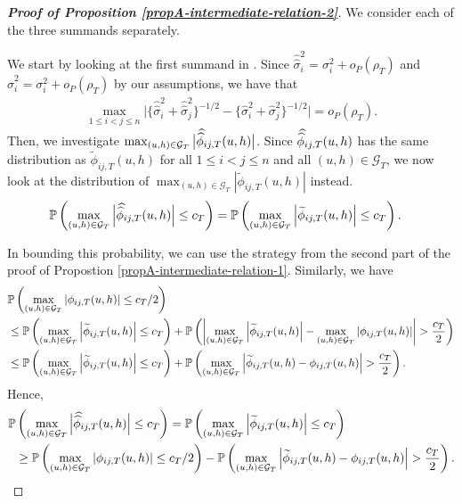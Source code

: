 \documentclass[a4paper,12pt]{article}
\makeatletter
\renewcommand{\eqref}[1]{\tagform@{\ref{#1}}}
\newcommand{\doublehat}[1]{\skew{5.5}\widehat{\widehat{#1}}}
\newcommand{\doublehattwo}[1]{\widehat{\widehat{#1}}}
\makeatother
\begin{document}
\begin{proof}[\textnormal{\textbf{Proof of Proposition \ref{propA-intermediate-relation-2}}}]
We consider each of the three summands separately.

We start by looking at the first summand in \eqref{ineq-diff-1}. Since $\doublehattwo{\sigma}_i^2 = \sigma_i^2 + o_P(\rho_T)$ and $\widehat{\sigma}_i^2 = \sigma_i^2 + o_P(\rho_T)$ by our assumptions, we have that 
\begin{align}\label{ineq-diff-2}
\max_{1 \le i < j \le n} \big|\{\doublehattwo{\sigma}_i^2 + \doublehattwo{\sigma}_j^2 \}^{-1/2} - \{\widehat{\sigma}_i^2 + \widehat{\sigma}_j^2 \}^{-1/2}\big| = o_P(\rho_T).
\end{align}
Then, we investigate $ \max_{(u,h) \in \mathcal{G}_T} \big|\doublehat{\phi}_{ij,T}(u,h)\big|$. Since $\doublehat{\phi}_{ij,T}(u,h)$ has the same distribution as $\widetilde{\phi}_{ij, T}(u, h)$ for all $1\le i < j \le n$ and all $(u, h) \in \mathcal{G}_T$, we now look at the distribution of $ \max_{(u,h) \in \mathcal{G}_T}\left|\widetilde{\phi}_{ij, T}(u, h)\right|$ instead.
\begin{align*}
\pr&\left(\max_{(u,h) \in \mathcal{G}_T}\Big|\doublehat{\phi}_{ij, T}(u, h)\Big| \leq c_T\right) = \pr\left(\max_{(u,h) \in \mathcal{G}_T}\left|\widetilde{\phi}_{ij, T}(u, h)\right| \leq c_T\right).
\end{align*}

In bounding this probability, we can use the strategy from the second part of the proof of Propostion \ref{propA-intermediate-relation-1}. Similarly, we have
\begin{align*}
&\mathbb{P}\left( \max_{(u,h) \in \mathcal{G}_T}\left|\phi_{ij, T}(u, h)\right| \leq c_T/2\right) \\
&\leq \mathbb{P}\left( \max_{(u,h) \in \mathcal{G}_T}\left|\widetilde{\phi}_{ij, T}(u, h)\right| \leq c_T\right) + \mathbb{P}\left(\left|\max_{(u,h) \in \mathcal{G}_T}\left|\widetilde{\phi}_{ij, T}(u, h)\right| - \max_{(u,h) \in \mathcal{G}_T}\left|\phi_{ij, T}(u, h)\right| \right| > \frac{c_T}{2}\right) \\
&\leq \mathbb{P}\left( \max_{(u,h) \in \mathcal{G}_T}\left|\widetilde{\phi}_{ij, T}(u, h)\right| \leq c_T\right) + \mathbb{P}\left(\max_{(u,h) \in \mathcal{G}_T}\left|\widetilde{\phi}_{ij, T}(u, h)- \phi_{ij, T}(u, h)\right| > \frac{c_T}{2}\right).
\end{align*}
Hence, 
\begin{align}\label{ineq-diff-3}
\begin{split}
\pr&\left(\max_{(u,h) \in \mathcal{G}_T}\Big|\doublehat{\phi}_{ij, T}(u, h)\Big| \leq c_T\right) = \pr\left(\max_{(u,h) \in \mathcal{G}_T}\left|\widetilde{\phi}_{ij, T}(u, h)\right| \leq c_T\right)\\
&\geq \pr\left( \max_{(u,h) \in \mathcal{G}_T}\left|\phi_{ij, T}(u, h)\right| \leq c_T/2\right) - \pr\left(\max_{(u,h) \in \mathcal{G}_T}\left|\widetilde{\phi}_{ij, T}(u, h)- \phi_{ij, T}(u, h)\right| > \frac{c_T}{2}\right).
\end{split}
\end{align}


\end{proof}
\end{document}
